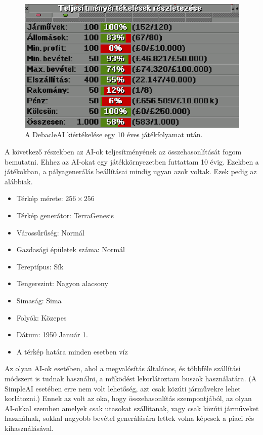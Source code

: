 \begin{figure}
	\centering
	\includegraphics[width=\textwidth]{images/atlag.png}
	\caption{A DebacleAI kiértékelése egy 10 éves játékfolyamat után.}
	\label{fig:atlag}
\end{figure}


A következő részekben az AI-ok teljesítményének az összehasonlítását fogom bemutatni. Ehhez az AI-okat egy játékkörnyezetben futtattam 10 évig. Ezekben a játékokban, a pályagenerálás beállításai mindig ugyan azok voltak. Ezek pedig az alábbiak.
\begin{itemize}
	\item Térkép mérete: $256 \times 256$
	\item Térkép generátor: TerraGenesis
	\item Várossűrűség: Normál
	\item Gazdasági épületek száma: Normál
	\item Tereptípus: Sík
	\item Tengerszint: Nagyon alacsony
	\item Simaság: Sima
	\item Folyók: Közepes
	\item Dátum: 1950 Január 1.
	\item A térkép határa minden esetben víz
\end{itemize}

Az olyan AI-ok esetében, ahol a megvalósítás általános, és többféle szállítási módszert is tudnak használni, a működést lekorlátoztam buszok használatára. (A SimpleAI esetében erre nem volt lehetőség, azt csak közúti járművekre lehet korlátozni.) Ennek az volt az oka, hogy összehasonlítás szempontjából, az olyan AI-okkal szemben amelyek csak utasokat szállítanak, vagy csak közúti járműveket használnak, sokkal nagyobb bevétel generálására lettek volna képesek a piaci rés kihasználásával.

